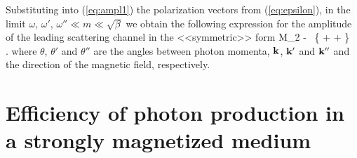 \documentclass[
aps,%
12pt,%
final,%
notitlepage,%
oneside,%
onecolumn,%
nobibnotes,%
nofootinbib,%
superscriptaddress,%
noshowpacs,%
centertags]%
{revtex4}
\begin{document}
Substituting into (\ref{eq:ampl1}) the polarization vectors from (\ref{eq:epsilon}), 
in the limit $\omega, \, \omega', \, \omega'' \ll m \ll \sqrt{\beta}$ we obtain the following 
expression for the amplitude of the leading scattering channel in the <<symmetric>> form
%
%
\beq
\label{eq:amp222}
{\cal M}_{2 } \simeq  -  \; 
 \;  \, \left \{ + 
 + \right \} \, .
\eeq
\noindent where $\theta$, $\theta'$ and $\theta''$ 
are the angles between photon momenta, ${\bf k}$, ${\bf k}'$ and ${\bf k}''$ and
the direction of the magnetic field, respectively.


\section{Efficiency of photon production in a strongly magnetized medium}
\end{document}
